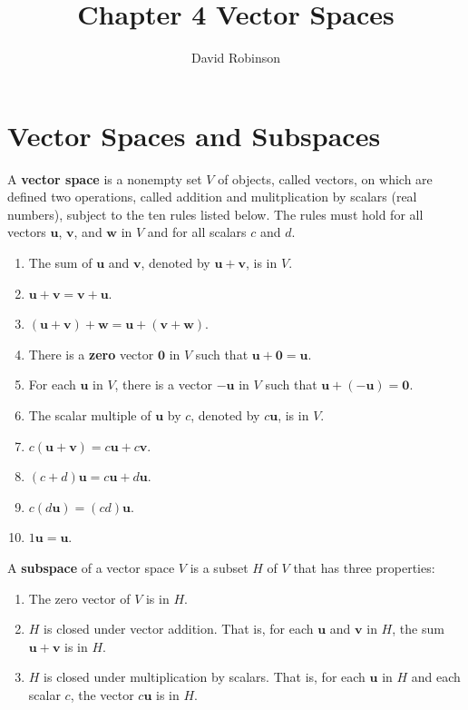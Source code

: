 \documentclass{article}
\title{Chapter 4 Vector Spaces}
\author{David Robinson}
\date{}
\begin{document}
\maketitle

\section*{Vector Spaces and Subspaces}
A \textbf{vector space} is a nonempty set $V$ of objects, called vectors, on which are defined two operations, called addition and mulitplication by scalars (real numbers), subject to the ten rules listed below. The rules must hold for all vectors $\mathbf{u}$, $\mathbf{v}$, and $\mathbf{w}$ in $V$ and for all scalars $c$ and $d$.

\begin{enumerate}
    \item The sum of $\mathbf{u}$ and $\mathbf{v}$, denoted by $\mathbf{u}+\mathbf{v}$, is in $V$.
    \item $\mathbf{u}+\mathbf{v}=\mathbf{v}+\mathbf{u}$.
    \item $(\mathbf{u}+\mathbf{v})+\mathbf{w}=\mathbf{u}+(\mathbf{v}+\mathbf{w})$.
    \item There is a \textbf{zero} vector $\mathbf{0}$ in $V$ such that $\mathbf{u}+\mathbf{0}=\mathbf{u}$.
    \item For each $\mathbf{u}$ in $V$, there is a vector $-\mathbf{u}$ in $V$ such that $\mathbf{u}+(-\mathbf{u})=\mathbf{0}$.
    \item The scalar multiple of $\mathbf{u}$ by $c$, denoted by $c\mathbf{u}$, is in $V$.
    \item $c(\mathbf{u}+\mathbf{v})=c\mathbf{u}+c\mathbf{v}$.
    \item $(c+d)\mathbf{u}=c\mathbf{u}+d\mathbf{u}$.
    \item $c(d\mathbf{u})=(cd)\mathbf{u}$.
    \item $1\mathbf{u}=\mathbf{u}$.
\end{enumerate}

A \textbf{subspace} of a vector space $V$ is a subset $H$ of $V$ that has three properties:
\begin{enumerate}
    \item The zero vector of $V$ is in $H$.
    \item $H$ is closed under vector addition. That is, for each $\mathbf{u}$ and $\mathbf{v}$ in $H$, the sum $\mathbf{u}+\mathbf{v}$ is in $H$.
    \item $H$ is closed under multiplication by scalars. That is, for each $\mathbf{u}$ in $H$ and each scalar $c$, the vector $c\mathbf{u}$ is in $H$.
\end{enumerate}
\end{document}
